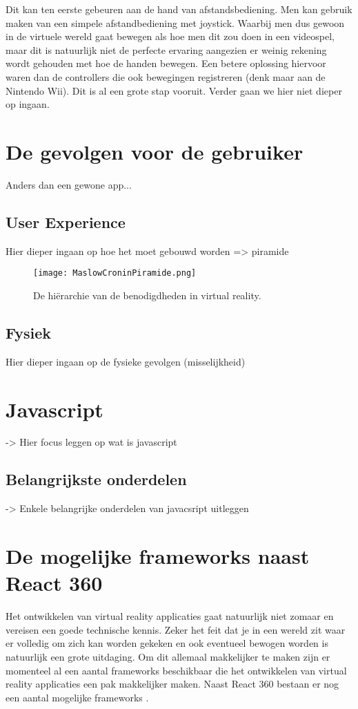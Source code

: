 Dit kan ten eerste gebeuren aan de hand van afstandsbediening. Men kan gebruik maken van een simpele afstandbediening met joystick. Waarbij men dus gewoon in de virtuele wereld gaat bewegen als hoe men dit zou doen in een videospel, maar dit is natuurlijk niet de perfecte ervaring aangezien er weinig rekening wordt gehouden met hoe de handen bewegen. Een betere oplossing hiervoor waren dan de controllers die ook bewegingen registreren (denk maar aan de Nintendo Wii). Dit is al een grote stap vooruit. Verder gaan we hier niet dieper op ingaan.

\section{De gevolgen voor de gebruiker}
\label{sec:gevolgen-vr}
Anders dan een gewone app...

\subsection{User Experience}
\label{subsec:user-experience}
Hier dieper ingaan op hoe het moet gebouwd worden => piramide
\autocite{Cronin2015}

\begin{figure}
	\centering
	\texttt{[image: MaslowCroninPiramide.png]}
	\caption{De hiërarchie van de benodigdheden in virtual reality.}
	\label{fig:maslowcroninpiramide}
\end{figure}

\subsection{Fysiek}
\label{subsec:fysiek}
Hier dieper ingaan op de fysieke gevolgen (misselijkheid)
\autocite{Pappas2016}

\section{Javascript}
\label{sec:frameworks}
-> Hier focus leggen op wat is javascript

\subsection{Belangrijkste onderdelen}
\label{subsec:Web VR}
-> Enkele belangrijke onderdelen van javacsript uitleggen

\section{De mogelijke frameworks naast React 360}
\label{sec:frameworks}
Het ontwikkelen van virtual reality applicaties gaat natuurlijk niet zomaar en vereisen een goede technische kennis. Zeker het feit dat je in een wereld zit waar er volledig om zich kan worden gekeken en ook eventueel bewogen worden is natuurlijk een grote uitdaging. Om dit allemaal makkelijker te maken zijn er momenteel al een aantal frameworks beschikbaar die het ontwikkelen van virtual reality applicaties een pak makkelijker maken. Naast React 360 bestaan er nog een aantal mogelijke frameworks \autocite{UIUXLab2017}.

